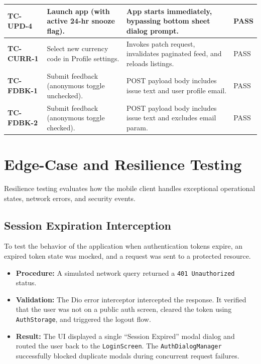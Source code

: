 \begin{table}[htbp]
\begin{tabular}{|l|p{4cm}|p{5cm}|l|}
\textbf{TC-UPD-4} & Launch app (with active 24-hr snooze flag). & App starts immediately, bypassing bottom sheet dialog prompt. & PASS \\ \hline
\textbf{TC-CURR-1} & Select new currency code in Profile settings. & Invokes patch request, invalidates paginated feed, and reloads listings. & PASS \\ \hline
\textbf{TC-FDBK-1} & Submit feedback (anonymous toggle unchecked). & POST payload body includes issue text and user profile email. & PASS \\ \hline
\textbf{TC-FDBK-2} & Submit feedback (anonymous toggle checked). & POST payload body includes issue text and excludes email param. & PASS \\ \hline
\end{tabular}
\end{table}

\section{Edge-Case and Resilience Testing}
Resilience testing evaluates how the mobile client handles exceptional operational states, network errors, and security events.

\subsection{Session Expiration Interception}
To test the behavior of the application when authentication tokens expire, an expired token state was mocked, and a request was sent to a protected resource. 
\begin{itemize}
    \item \textbf{Procedure:} A simulated network query returned a \texttt{401 Unauthorized} status.
    \item \textbf{Validation:} The Dio error interceptor intercepted the response. It verified that the user was not on a public auth screen, cleared the token using \texttt{AuthStorage}, and triggered the logout flow.
    \item \textbf{Result:} The UI displayed a single ``Session Expired'' modal dialog and routed the user back to the \texttt{LoginScreen}. The \texttt{AuthDialogManager} successfully blocked duplicate modals during concurrent request failures.
\end{itemize}

